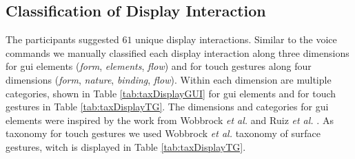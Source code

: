 \documentclass[sigchi]{acmart}
\begin{document}
	\subsection{Classification of Display Interaction}
	The participants suggested $61$ unique display interactions. Similar to the voice commands we manually classified each display interaction along three dimensions for \ac{gui} elements (\textit{form}, \textit{elements}, \textit{flow}) and for touch gestures along four dimensions (\textit{form}, \textit{nature}, \textit{binding}, \textit{flow}). Within each dimension are multiple categories, shown in Table \ref{tab:taxDisplayGUI} for \ac{gui} elements and for touch gestures in Table \ref{tab:taxDisplayTG}. The dimensions and categories for \ac{gui} elements were inspired by the work from Wobbrock \textit{et al.} \citep{Wobbrock.2009} and Ruiz \textit{et al.} \citep{Ruiz.2011}. As taxonomy for touch gestures we used Wobbrock \textit{et al.} \citep{Wobbrock.2009} taxonomy of surface gestures, witch is displayed in Table \ref{tab:taxDisplayTG}.
\end{document}
